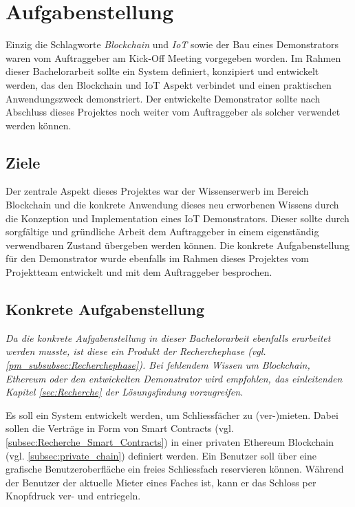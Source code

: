 \chapter{Aufgabenstellung}
\label{cha:Aufgabenstellung}
Einzig die Schlagworte \emph{Blockchain} und \emph{\acrfull{IoT}} sowie der Bau eines Demonstrators waren vom Auftraggeber am Kick-Off Meeting vorgegeben worden. Im Rahmen dieser Bachelorarbeit sollte ein System definiert, konzipiert und entwickelt werden, das den Blockchain und IoT Aspekt verbindet und einen praktischen Anwendungszweck demonstriert. Der entwickelte Demonstrator sollte nach Abschluss dieses Projektes noch weiter vom Auftraggeber als solcher verwendet werden können.

\section{Ziele}
\label{sec:Ziele}
Der zentrale Aspekt dieses Projektes war der Wissenserwerb im Bereich Blockchain und die konkrete Anwendung dieses neu erworbenen Wissens durch die Konzeption und Implementation eines IoT Demonstrators. Dieser sollte durch sorgfältige und gründliche Arbeit dem Auftraggeber in einem eigenständig verwendbaren Zustand übergeben werden können. Die konkrete Aufgabenstellung für den Demonstrator wurde ebenfalls im Rahmen dieses Projektes vom Projektteam entwickelt und mit dem Auftraggeber besprochen.


\section{Konkrete Aufgabenstellung}
\label{sec:Konkrete_Aufgabenstellung}
\emph{Da die konkrete Aufgabenstellung in dieser Bachelorarbeit ebenfalls erarbeitet werden musste, ist diese ein Produkt der Recherchephase (vgl. \ref{pm_subsubsec:Recherchephase}). Bei fehlendem Wissen um Blockchain, Ethereum oder den entwickelten Demonstrator wird empfohlen, das einleitenden Kapitel \ref{sec:Recherche}  der Lösungsfindung vorzugreifen.}

Es soll ein System entwickelt werden, um Schliessfächer zu (ver-)mieten. Dabei sollen die Verträge in Form von Smart Contracts (vgl. \ref{subsec:Recherche_Smart_Contracts}) in einer privaten Ethereum Blockchain (vgl. \ref{subsec:private_chain}) definiert werden. Ein Benutzer soll über eine grafische Benutzeroberfläche ein freies Schliessfach reservieren können. Während der Benutzer der aktuelle Mieter eines Faches ist, kann er das Schloss per Knopfdruck ver- und entriegeln.



